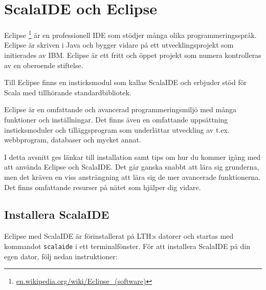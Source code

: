 
\section{ScalaIDE och Eclipse}\label{appendix:ide:eclipse}

Eclipse%
\footnote{\href{https://en.wikipedia.org/wiki/Eclipse_(software)}{en.wikipedia.org/wiki/Eclipse\_(software)}}
är en professionell IDE som stödjer många olika programmeringsspråk. Eclipse är skriven i Java och bygger vidare på ett utvecklingsprojekt som initierades av IBM. Eclipse är ett fritt och öppet projekt som numera kontrolleras av en oberoende stiftelse.

Till Eclipse finns en insticksmodul  som kallas ScalaIDE och erbjuder stöd för Scala med tillhörande standardbibliotek.

Eclipse är en omfattande och avancerad programmeringsmiljö med många funktioner och inställningar. Det finns även en omfattande uppsättning insticksmoduler och tilläggsprogram som underlättar utveckling av t.ex. webbprogram, databaser och mycket annat.

I detta avsnitt ges länkar till installation samt tips om hur du kommer igång med att använda Eclipse och ScalaIDE. Det går ganska snabbt att lära sig grunderna, men det kräven en viss ansträngning att lära sig de mer avancerade funktionerna. Det finns omfattande resurser på nätet som hjälper dig vidare.


\subsection{Installera ScalaIDE}\label{appendix:ide:eclipse:install}

Eclipse med ScalaIDE är förinstallerat på LTH:s datorer och startas med kommandot \texttt{scalaide} i ett terminalfönster.
För att installera ScalaIDE på din egen dator, följ nedan instruktioner:

